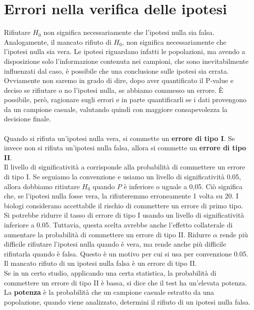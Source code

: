 \documentclass[10pt, draft]{book}
\begin{document}
\section{Errori nella verifica delle ipotesi}
Rifiutare $H_0$ non significa necessariamente che l'ipotesi nulla sia falsa. 
\\
Analogamente, il mancato rifiuto di $H_0$, non significa necessariamente che l'ipotesi nulla sia vera. Le ipotesi riguardano infatti le popolazioni, ma avendo a disposizione solo l'informazione contenuta nei campioni, che sono inevitabilmente influenzati dal caso, è possibile che una conclusione sulle ipotesi sia errata. 
\\
Ovviamente non saremo in grado di dire, dopo aver quantificato il P-value e deciso se rifiutare o no l'ipotesi nulla, se abbiamo commesso un errore. È possibile, però, ragionare sugli errori e in parte quantificarli se i dati provengono da un campione casuale, valutando quindi con maggiore consapevolezza la decisione finale. 
\\
\\
Quando si rifiuta un'ipotesi nulla vera, si commette un \textbf{errore di tipo I}. Se invece non si rifiuta un'ipotesi nulla falsa, allora si commette un \textbf{errore di tipo II}. 
\\
Il livello di significatività a corrisponde alla probabilità di commettere un errore di tipo I. Se seguiamo la convenzione e usiamo un livello di significatività 0.05, allora dobbiamo ritiutare $H_0$ quando $P$ è inferiore o uguale a 0,05. Ciò significa che, se l'ipotesi nulla fosse vera, la rifiuteremmo erroneamente 1 volta su 20. I biologi considerano accettabile il rischio di commettere un errore di primo tipo. 
\\
Si potrebbe ridurre il tasso di errore di tipo I usando un livello di significatività inferiore a 0.05. Tuttavia, questa scelta avrebbe anche l'effetto collaterale di aumentare la probabilità di commettere un errore di tipo II. Ridurre $\alpha$ rende più difficile rifiutare l'ipotesi nulla quando è vera, ma rende anche più difficile rifiutarla quando è falsa. Questo è un motivo per cui si usa per convenzione 0.05.
\\
Il mancato rifiuto di un ipotesi nulla falsa è un errore di tipo II.
\\
Se in un certo studio, applicando una certa statistica, la probabilità di commettere un errore di tipo II è bassa, si dice che il test ha un'elevata potenza. La \textbf{potenza} è la probabilità che un campione casuale estratto da una popolazione, quando viene analizzato, determini il rifiuto di un ipotesi nulla falsa.
\end{document}
